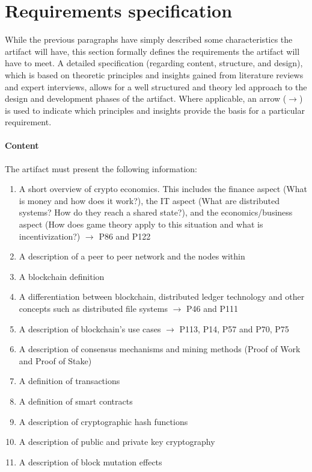 \section{Requirements specification} \label{sec:ReqSpec}
While the previous paragraphs have simply described some characteristics the artifact will have, this section formally defines the requirements the artifact will have to meet. A detailed specification (regarding content, structure, and design), which is based on theoretic principles and insights gained from literature reviews and expert interviews, allows for a well structured and theory led approach to the design and development phases of the artifact. Where applicable, an arrow ($\rightarrow$) is used to indicate which principles and insights provide the basis for a particular requirement.

\paragraph{Content} The artifact must present the following information: 
\begin{enumerate}
    \item A short overview of crypto economics. This includes the finance aspect (What is money and how does it work?), the IT aspect (What are distributed systems? How do they reach a shared state?), and the economics/business aspect (How does game theory apply to this situation and what is incentivization?) $\rightarrow$ \cite{RalphBeckmann_Interview} P86 and P122
    \item A description of a peer to peer network and the nodes within
    \item A blockchain definition 
    \item A differentiation between blockchain, distributed ledger technology and other concepts such as distributed file systems $\rightarrow$ \cite{DanielKaltenbach_Interview} P46 and \cite{RalphBeckmann_Interview} P111
    \item A description of blockchain's use cases $\rightarrow$ \cite{RalphBeckmann_Interview} P113, \cite{DanielKaltenbach_Interview} P14, P57 and \cite{BjoernPaulewicz_Interview} P70, P75
    \item A description of consensus mechanisms and mining methods (Proof of Work and Proof of Stake)
    \item A definition of transactions
    \item A definition of smart contracts
    \item A description of cryptographic hash functions
    \item A description of public and private key cryptography
    \item A description of block mutation effects
\setcounter{foo}{\value{enumi}}
\end{enumerate}

